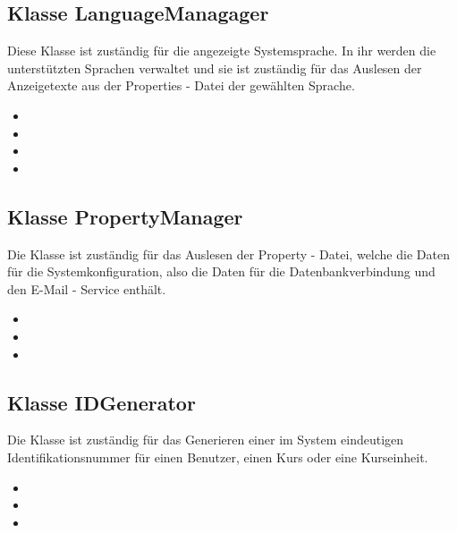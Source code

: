 	\subsection{Klasse LanguageManagager}
	Diese Klasse ist zuständig für die angezeigte Systemsprache. In ihr werden die unterstützten Sprachen verwaltet und sie ist zuständig für das Auslesen der Anzeigetexte aus der Properties - Datei der gewählten Sprache.
	\begin{itemize}
		\item {}
		\item {}
		\item {}
		\item {}
	\end{itemize}
	
	\subsection{Klasse PropertyManager}
	Die Klasse ist zuständig für das Auslesen der Property - Datei, welche die Daten für die Systemkonfiguration, also die Daten für die Datenbankverbindung und den E-Mail - Service enthält.
	\begin{itemize}
		\item {}
		\item {}
		\item {}
	\end{itemize}
	
	\subsection{Klasse IDGenerator}
	Die Klasse ist zuständig für das Generieren einer im System eindeutigen Identifikationsnummer für einen Benutzer, einen Kurs oder eine Kurseinheit.
	\begin{itemize}
		\item {}
		\item {}
		\item {}
	\end{itemize}
	
